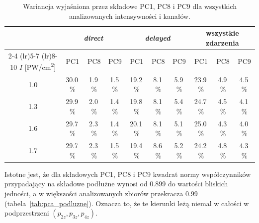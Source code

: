 \documentclass[12pt,a4paper]{article}
\newcommand{\PWcm}{PW/cm\textsuperscript{2}}
\begin{document}
\begin{table}[H]
\centering
\small
\setlength{\tabcolsep}{4.5pt}
\caption{Wariancja wyjaśniona przez składowe PC1, PC8 i PC9
dla wszystkich analizowanych intensywności i kanałów.}
\label{tab:pca_wariancja}
\begin{tabular}{c ccc ccc ccc}
\toprule
& \multicolumn{3}{c}{\emph{direct}}
& \multicolumn{3}{c}{\emph{delayed}}
& \multicolumn{3}{c}{wszystkie zdarzenia} \\
\cmidrule(lr){2-4}
\cmidrule(lr){5-7}
\cmidrule(lr){8-10}
$I$ [\PWcm]
& PC1 & PC8 & PC9
& PC1 & PC8 & PC9
& PC1 & PC8 & PC9 \\
\midrule
\num{1.0} & \num{30.0}\,\% & \num{1.9}\,\% & \num{1.5}\,\% & \num{19.2}\,\% & \num{8.1}\,\% & \num{5.9}\,\% & \num{23.9}\,\% & \num{4.9}\,\% & \num{4.5}\,\% \\
\num{1.3} & \num{29.9}\,\% & \num{2.0}\,\% & \num{1.4}\,\% & \num{19.8}\,\% & \num{8.1}\,\% & \num{5.4}\,\% & \num{24.7}\,\% & \num{4.5}\,\% & \num{4.1}\,\% \\
\num{1.6} & \num{29.7}\,\% & \num{2.3}\,\% & \num{1.4}\,\% & \num{20.1}\,\% & \num{8.1}\,\% & \num{5.1}\,\% & \num{25.0}\,\% & \num{4.3}\,\% & \num{4.0}\,\% \\
\num{1.7} & \num{29.7}\,\% & \num{2.3}\,\% & \num{1.5}\,\% & \num{19.4}\,\% & \num{8.6}\,\% & \num{5.2}\,\% & \num{24.2}\,\% & \num{4.8}\,\% & \num{4.3}\,\% \\
\bottomrule
\end{tabular}
\end{table}

Istotne jest, że dla składowych PC1, PC8 i PC9 kwadrat normy współczynników przypadający na składowe podłużne wynosi od \num{0.899} do wartości bliskich jedności, a w większości analizowanych zbiorów przekracza \num{0.99} (tabela~\ref{tab:pca_podluzne}). Oznacza to, że te kierunki leżą niemal w całości w podprzestrzeni $(p_{2z},p_{3z},p_{4z})$.
\end{document}
